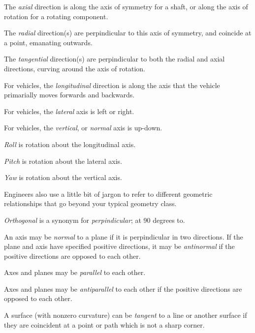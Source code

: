 \begin{asparaenum}[a)]
	\item The \textit{axial} direction is along the axis of symmetry for a shaft, or along the axis of rotation for a rotating component. 
	\item The \textit{radial} direction(s) are perpindicular to this axis of symmetry, and coincide at a point, emanating outwards. 
	\item The \textit{tangential} direction(s) are perpindicular to both the radial and axial directions, curving around the axis of rotation. 
	\item For vehicles, the \textit{longitudinal} direction is along the axis that the vehicle primarially moves forwards and backwards.
	\item For vehicles, the \textit{lateral} axis is left or right.
	\item For vehicles, the \textit{vertical}, or \textit{normal} axis is up-down.
	\item \textit{Roll} is rotation about the longitudinal axis.
	\item \textit{Pitch} is rotation about the lateral axis.
	\item \textit{Yaw} is rotation about the vertical axis.
\end{asparaenum}

Engineers also use a little bit of jargon to refer to different geometric relationships that go beyond your typical geometry class.

\begin{asparaenum}[a)]
	\item \textit{Orthogonal} is a synonym for \textit{perpindicular}; at 90 degrees to. 
	\item An axis may be \textit{normal} to a plane if it is perpindicular in two directions. 
	If the plane and axis have specified positive directions, it may be \textit{antinormal} if the positive directions are opposed to each other. 
	\item Axes and planes may be \textit{parallel} to each other. 
	\item Axes and planes may be \textit{antiparallel} to each other if the positive directions are opposed to each other. 
	\item A surface (with nonzero curvature) can be \textit{tangent} to a line or another surface if they are coincident at a point or path which is not a sharp corner. 
\end{asparaenum}

